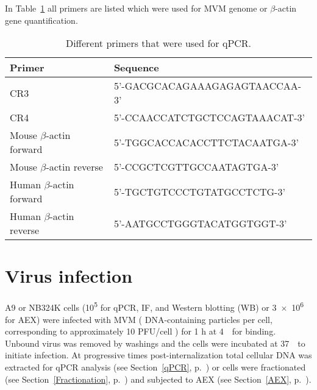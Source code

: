 In Table~\ref{Primers} all primers are listed which were used for MVM genome or $\beta$-actin gene quantification. 
\begin{table}[H]
\begin{center}
\begin{tabular}{l l}
\textbf{Primer} & \textbf{Sequence}\\
\hline
CR3 & 5'-GACGCACAGAAAGAGAGTAACCAA-3'\\
CR4 & 5'-CCAACCATCTGCTCCAGTAAACAT-3'\\
Mouse $\beta$-actin forward & 5'-TGGCACCACACCTTCTACAATGA-3' \\
Mouse $\beta$-actin reverse & 5'-CCGCTCGTTGCCAATAGTGA-3' \\
Human $\beta$-actin forward & 5'-TGCTGTCCCTGTATGCCTCTG-3' \\
Human $\beta$-actin reverse & 5'-AATGCCTGGGTACATGGTGGT-3' \\
\end{tabular} 
\end{center} 
\caption[Primers]{Different primers that were used for qPCR.}
\label{Primers}
\end{table}


\section{Virus infection} 

A9 or NB324K cells (10\textsuperscript{5} for qPCR, IF, and Western blotting (WB) or 3~$\times$~10\textsuperscript{6} for AEX) were infected with MVM ( DNA-containing particles per cell, corresponding to approximately 10 PFU/cell \cite{pmid4673484}) for 1 h at 4~\textcelsius~for binding. Unbound virus was removed by washings and the cells were incubated at 37~\textcelsius~to initiate infection. At progressive times post-internalization total cellular DNA was extracted for qPCR analysis (see Section~\ref{qPCR}, p.~\pageref{qPCR}) or cells were fractionated (see Section~\ref{Fractionation}, p.~\pageref{Fractionation}) and subjected to AEX (see Section~\ref{AEX}, p.~\pageref{AEX}).    



